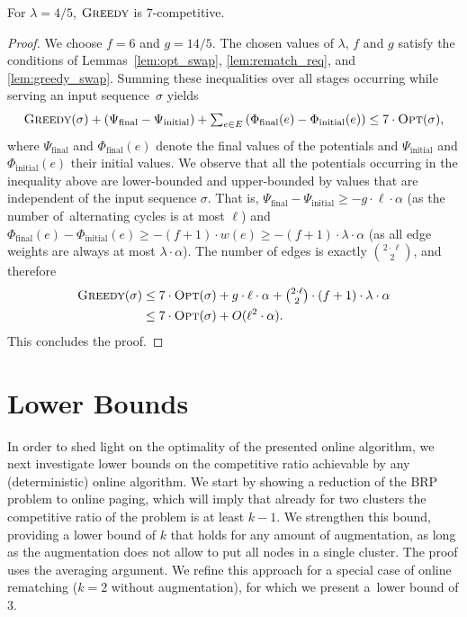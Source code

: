 \begin{theorem}
\label{thm:rematching}
For $\lambda = 4/5$, $\textsc{Greedy}$ is $7$-competitive.
\end{theorem}

\begin{proof}
We choose $f = 6$ and $g = 14/5$. The chosen values of $\lambda$, $f$ and $g$
satisfy the conditions of Lemmas~\ref{lem:opt_swap}, \ref{lem:rematch_req},
and \ref{lem:greedy_swap}. Summing these
inequalities over all stages occurring while serving an input sequence~$\sigma$
yields
\begin{equation*}
	\textstyle \textsc{Greedy}(\sigma) + (\Psi_\textrm{final} - \Psi_\textrm{initial})
	+ \sum_{e \in E} \left( 
		\Phi_\textrm{final}(e) - \Phi_\textrm{initial}(e) \right)
	\leq 7 \cdot \textsc{Opt}(\sigma),
\end{equation*}
where $\Psi_\textrm{final}$ and $\Phi_\textrm{final}(e)$ denote the final
values of the potentials and $\Psi_\textrm{initial}$ and
$\Phi_\textrm{initial}(e)$ their initial values. We observe that all the
potentials occurring in the inequality above are lower-bounded and
upper-bounded by values that are independent of the input sequence $\sigma$.
That is, $\Psi_\textrm{final} - \Psi_\textrm{initial} \geq - g \cdot \ell
\cdot \alpha$ (as the number of~alternating cycles is at most $\ell$) and
$\Phi_\textrm{final}(e) - \Phi_\textrm{initial}(e) \geq - (f+1) \cdot w(e)
\geq - (f+1) \cdot \lambda \cdot \alpha$ (as all edge weights are always 
at most $\lambda \cdot \alpha$). The number of edges is exactly $\binom{2
\cdot \ell}{2}$, and therefore
\begin{align*}
	 \textsc{Greedy}(\sigma) 
	\leq &\; 7 \cdot \textsc{Opt}(\sigma) 
	+ \textstyle g \cdot \ell \cdot \alpha + \binom{2 \cdot \ell}{2} \cdot (f+1) \cdot 
	\lambda \cdot \alpha \\
	\leq &\; 7 \cdot \textsc{Opt}(\sigma) 
	+ O(\ell^2 \cdot \alpha).
\end{align*}
This concludes the proof.
\end{proof}



\section{Lower Bounds}
\label{sec:lower}

In order to shed light on the optimality of the presented online algorithm, we
next investigate lower bounds on the competitive ratio achievable by any
(deterministic) online algorithm. We start by showing a reduction of the BRP
problem to online paging, which will imply that already for two clusters the
competitive ratio of the problem is at least $k-1$. We strengthen this bound,
providing a lower bound of $k$ that holds for any amount of augmentation, as
long as the augmentation does not allow to put all nodes in a single 
cluster. The proof uses the averaging argument. We refine this approach for a
special case of online rematching ($k = 2$ without augmentation), for which we
present a~lower bound of $3$.


